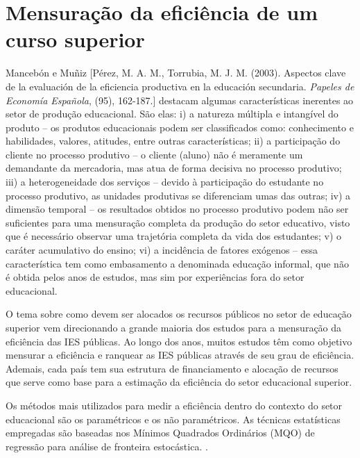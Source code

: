 \section{Mensuração da eficiência de um curso superior}

Mancebón e Muñiz [Pérez, M. A. M., Torrubia, M. J. M. (2003). Aspectos clave de la evaluación de la eficiencia productiva en la educación secundaria. \textit{Papeles de Economía Española}, (95), 162-187.] destacam algumas características inerentes ao setor de produção educacional. São elas: i) a natureza múltipla e intangível do produto – os produtos educacionais podem ser classificados como: conhecimento e habilidades, valores, atitudes, entre outras características; ii) a participação do cliente no processo produtivo – o cliente (aluno) não é meramente um demandante da mercadoria, mas atua de forma decisiva no processo produtivo; iii) a heterogeneidade dos serviços – devido à participação do estudante no processo produtivo, as unidades produtivas se diferenciam umas das outras; iv) a dimensão temporal – os resultados obtidos no processo produtivo podem não ser suficientes para uma mensuração completa da produção do setor educativo, visto que é necessário observar uma trajetória completa da vida dos estudantes; v) o caráter acumulativo do ensino; vi) a incidência de fatores exógenos – essa característica tem como embasamento a denominada educação informal, que não é obtida pelos anos de estudos, mas sim por experiências fora do setor educacional. \cite[p. 417]{Costa_Souza_Ramos_Silva_2012}

O tema sobre como devem ser alocados os recursos públicos no setor de educação superior vem direcionando a grande maioria dos estudos para a mensuração da eficiência das IES públicas. Ao longo dos anos, muitos estudos têm como objetivo mensurar a eficiência e ranquear as IES públicas através de seu grau de eficiência. Ademais, cada país tem sua estrutura de financiamento e alocação de recursos que serve como base para a estimação da eficiência do setor educacional superior. \cite[p. 418]{Costa_Souza_Ramos_Silva_2012}

Os métodos mais utilizados para medir a eficiência dentro do contexto do setor educacional são os paramétricos e os não paramétricos. As técnicas estatísticas empregadas são baseadas nos Mínimos Quadrados Ordinários (MQO) de regressão para análise de fronteira estocástica. \cite[p.~418]{Costa_Souza_Ramos_Silva_2012}.